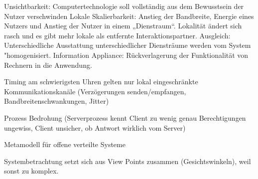 \documentclass[ngerman,a4paper,12pt]{scrreprt}
\begin{document}
\ul
	\li  Unsichtbarkeit:
	\ra Computertechnologie soll vollständig aus dem Bewusstsein der Nutzer
	verschwinden
	\li Lokale Skalierbarkeit:
	\ra Anstieg der Bandbreite, Energie eines Nutzers und Anstieg der Nutzer
	in einem „Dienstraum“. Lokalität ändert sich rasch und es gibt mehr
	lokale als entfernte Interaktionspartner.
	\li Ausgleich:
	\ra Unterschiedliche Ausstattung unterschiedlicher Diensträume werden
	vom System "homogenisiert.
	\li Information Appliance:
	\ra Rückverlagerung der Funktionalität von Rechnern in die Anwendung.
\ulE


\ul
	\li Timing am schwierigsten
	\li Uhren gelten nur lokal
	\li eingeschränkte Kommunikationskanäle (Verzögerungen senden/empfangen, Bandbreitenschwankungen, Jitter)
\ulE


\ul
	\li Prozess Bedrohung (Serverprozess kennt Client zu wenig genau \ra Berechtigungen ungewiss, Client unsicher, ob Antwort wirklich vom Server)
\ulE

Metamodell für offene verteilte Systeme

Systembetrachtung setzt sich aus View Points zusammen (Gesichtswinkeln), weil  sonst zu komplex.


\end{document}

